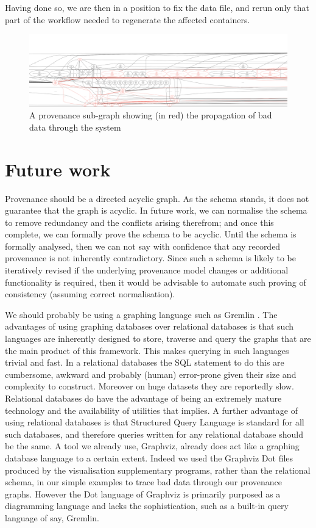 \documentclass[runningheads]{llncs}
\begin{document}
\normalsize

Having done so, we are then in a position to fix the data file, and rerun only that part of the workflow needed to regenerate the affected containers.

\begin{figure} \includegraphics[width=\textwidth]{img/high-lit-provenance-trace.pdf}
\caption{A provenance sub-graph showing (in red) the propagation of bad data through the system} \label{fig:high-lit-provenance-trace} \end{figure}

\section{Future work}

Provenance should be a directed acyclic graph. As the schema stands, it does not
guarantee that the graph is acyclic. In future work, we can  normalise the
schema to remove redundancy and the conflicts arising therefrom;
and once this complete, we can formally prove the schema to be acyclic. 
Until the schema is formally analysed, then we can not say with confidence that
any recorded provenance is not inherently contradictory. Since such a schema is likely to be
iteratively revised if the underlying provenance model changes or additional
functionality is required, then it would be advisable to automate such proving
of consistency (assuming correct normalisation). 

We should probably be using a graphing language such as Gremlin \cite{rodriguez2015gremlin}. The
advantages of using graphing databases over relational databases is that such
languages are inherently designed to store, traverse and query the graphs that
are the main product of this framework. This makes querying in such languages
trivial and fast. In a relational databases the SQL statement to do this are
cumbersome, awkward and probably (human) error-prone given their size and complexity to construct. Moreover on huge
datasets they are reportedly slow. Relational databases do have the advantage
of being an extremely mature technology and the availability of utilities that
implies. A further advantage of using relational databases is that
Structured Query Language is standard for all such databases, and therefore
queries written for any relational database should be the same. A tool we
already use, Graphviz, already does act like a graphing database language to a
certain extent. Indeed we used the Graphviz Dot files produced by the visualisation supplementary programs, rather than the
relational schema, in our simple examples to trace bad data through our
provenance graphs.  However the Dot language of Graphviz is primarily
purposed as a diagramming language and lacks the sophistication, such as a
built-in query language of say, Gremlin.
\end{document}
